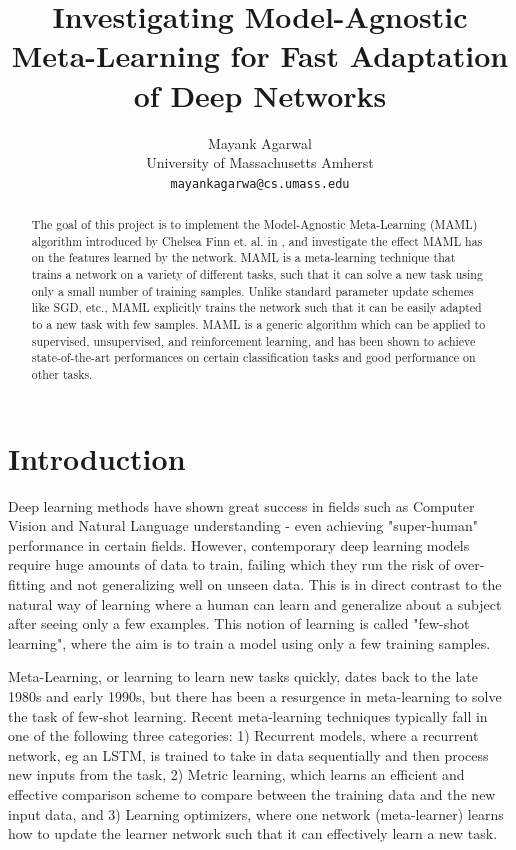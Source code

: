 \documentclass[10pt,twocolumn,letterpaper]{article}
\begin{document}
\title{Investigating Model-Agnostic Meta-Learning for Fast Adaptation of Deep Networks}

\author{Mayank Agarwal\\
University of Massachusetts Amherst\\
{\tt\small mayankagarwa@cs.umass.edu}
}

\maketitle

\begin{abstract}
   The goal of this project is to implement the Model-Agnostic Meta-Learning (MAML) algorithm introduced by Chelsea Finn et. al. in    \cite{finn2017model}, and investigate the effect MAML has on the features learned by the network. MAML is a meta-learning technique that trains a network on a variety of different tasks, such that it can solve a new task using only a small number of training samples. Unlike standard parameter update schemes like SGD, etc., MAML explicitly trains the network such that it can be easily adapted to a new task with few samples. MAML is a generic algorithm which can be applied to supervised, unsupervised, and reinforcement learning, and has been shown to achieve state-of-the-art performances on certain classification tasks and good performance on other tasks. 
\end{abstract}

\section{Introduction}

Deep learning methods have shown great success in fields such as Computer Vision and Natural Language understanding - even achieving "super-human" performance in certain fields. However, contemporary deep learning models require huge amounts of data to train, failing which they run the risk of over-fitting and not generalizing well on unseen data. This is in direct contrast to the natural way of learning where a human can learn and generalize about a subject after seeing only a few examples. This notion of learning is called "few-shot learning", where the aim is to train a model using only a few training samples.

Meta-Learning, or learning to learn new tasks quickly, dates back to the late 1980s and early 1990s, but there has been a resurgence in meta-learning to solve the task of few-shot learning. Recent meta-learning techniques typically fall in one of the following three categories: 1) Recurrent models, where a recurrent network, eg an LSTM, is trained to take in data sequentially and then process new inputs from the task, 2) Metric learning, which learns an efficient and effective comparison scheme to compare between the training data and the new input data, and 3) Learning optimizers, where one network (meta-learner) learns how to update the learner network such that it can effectively learn a new task.
\end{document}
